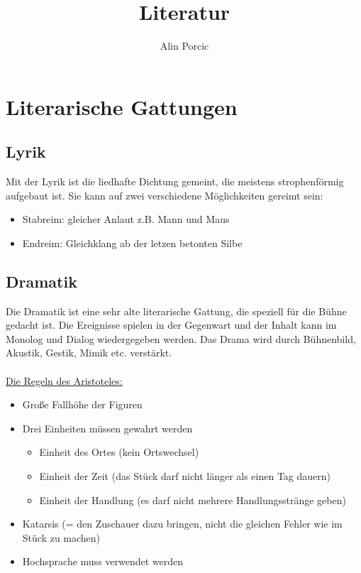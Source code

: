 \documentclass[12pt,a4paper]{article}
\title{Literatur}
\author{Alin Porcic}
\begin{document}
\maketitle
\newpage
\tableofcontents
\newpage

\section{Literarische Gattungen}
\subsection{Lyrik}

Mit der Lyrik ist die liedhafte Dichtung gemeint, die meistens strophenförmig aufgebaut ist. Sie kann auf zwei verschiedene Möglichkeiten gereimt sein:
	\begin{itemize}
	\item Stabreim: gleicher Anlaut z.B. Mann und Maus
	\item Endreim: Gleichklang ab der letzen betonten Silbe
	\end{itemize}

\subsection{Dramatik}

Die Dramatik ist eine sehr alte literarische Gattung, die speziell für die Bühne gedacht ist. Die Ereignisse spielen in der Gegenwart und der Inhalt kann im Monolog und Dialog wiedergegeben werden. Das Drama wird durch Bühnenbild, Akustik, Gestik, Mimik etc. verstärkt.\\\\
\underline{Die Regeln des Aristoteles:}

	\begin{itemize}
	\item Große Fallhöhe der Figuren
	\item Drei Einheiten müssen gewahrt werden
		\begin{itemize}
		\item Einheit des Ortes (kein Ortswechsel)
		\item Einheit der Zeit (das Stück darf nicht länger als einen Tag dauern)
		\item Einheit der Handlung (es darf nicht mehrere Handlungsstränge geben)
		\end{itemize}
	\item Katarsis (= den Zuschauer dazu bringen, nicht die gleichen Fehler wie im Stück zu machen)
	\item Hochsprache muss verwendet werden
	\end{itemize}
\end{document}
